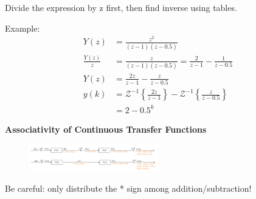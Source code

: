 Divide the expression by z first, then find inverse using tables.

Example:
\begin{align*}
    Y(z) &= \frac{z^2}{(z-1)(z-0.5) } \\
    \frac{Y(z)}{z} &= \frac{z}{(z-1)(z-0.5)} = \frac{2}{z-1} - \frac{1}{z-0.5} \\
    Y(z) &= \frac{2z}{z-1} - \frac{z}{z-0.5} \\
    y(k) &= \mathcal{Z}^{-1}\left\{\frac{2z}{z-1}\right\} - \mathcal{Z}^{-1}\left\{ \frac{z}{z-0.5}\right\} \\
    &= 2 - 0.5^{k}
\end{align*}

\textbf{\large Associativity of Continuous Transfer Functions}
\begin{figure}[H]
    \centering
    \includegraphics[width=0.5\textwidth]{images/associativity.png}
\end{figure}
Be careful: only distribute the * sign among addition/subtraction!

